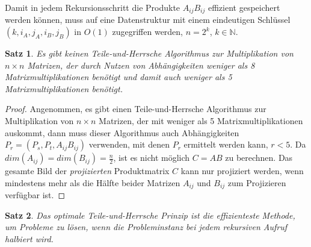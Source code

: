 \documentclass{report}
\newtheorem{satz}{Satz}[section]
\numberwithin{equation}{section}
\begin{document}
Damit in jedem Rekursionsschritt die Produkte $A_{ij}B_{ij}$ effizient gespeichert werden können, muss auf eine Datenstruktur mit einem eindeutigen Schlüssel $(k, i_{A}, j_{A}, i_{B}, j_{B})$ in $O(1)$ zugegriffen werden, $n = 2^k$, $k \in \mathbb{N}$.
\begin{satz}
	Es gibt keinen Teile-und-Herrsche Algorithmus zur Multiplikation von $n \times n$ Matrizen, der durch Nutzen von Abhängigkeiten weniger als 8 Matrixmultiplikationen benötigt und damit auch weniger als 5 Matrixmultiplikationen benötigt. 
\end{satz}
\begin{proof}
	Angenommen, es gibt einen Teile-und-Herrsche Algorithmus zur Multiplikation von $n \times n$ Matrizen, der mit weniger als 5 Matrixmultiplikationen auskommt, dann muss dieser Algorithmus auch Abhängigkeiten $P_r = (P_s, P_t, A_{ij}B_{ij})$ verwenden, mit denen $P_r$ ermittelt werden kann, $r < 5$. Da $dim(A_{ij}) = dim(B_{ij}) = \frac{n}{2}$, ist es nicht möglich $C = AB$ zu berechnen. Das gesamte Bild der \textit{projizierten} Produktmatrix $C$ kann nur projiziert werden, wenn mindestens mehr als die Hälfte beider Matrizen $A_{ij}$ und $B_{ij}$ zum Projizieren verfügbar ist.
\end{proof}
\begin{satz}
	Das optimale Teile-und-Herrsche Prinzip ist die effizienteste Methode, um Probleme zu lösen, wenn die Probleminstanz bei jedem rekursiven Aufruf halbiert wird. 
\end{satz}
\end{document}
